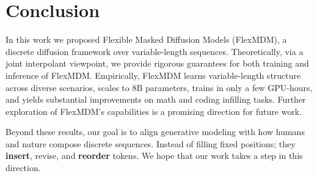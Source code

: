 \section{Conclusion}
In this work we proposed Flexible Masked Diffusion Models (FlexMDM), a discrete diffusion framework over variable-length sequences. Theoretically, via a joint interpolant viewpoint, we provide rigorous guarantees for both training and inference of FlexMDM. Empirically, FlexMDM learns variable-length structure across diverse scenarios, scales to 8B parameters, trains in only a few GPU-hours, and yields substantial improvements on math and coding infilling tasks. Further exploration of FlexMDM’s capabilities is a promising direction for future work.

Beyond these results, our goal is to align generative modeling with how humans and nature compose discrete sequences. Instead of filling fixed positions; they \textbf{insert}, revise, and \textbf{reorder} tokens. We hope that our work takes a step in this direction.